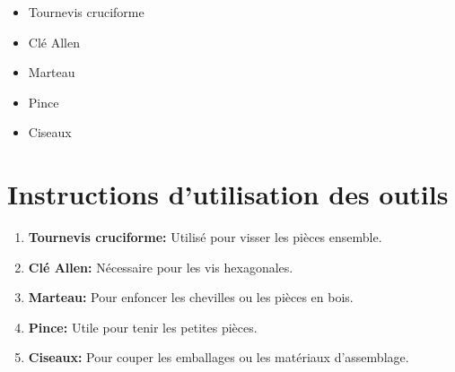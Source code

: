 
\begin{itemize}[label=\textbullet]
    \item Tournevis cruciforme
    \item Clé Allen
    \item Marteau
    \item Pince
    \item Ciseaux
\end{itemize}

\section*{Instructions d'utilisation des outils}

\begin{enumerate}
    \item \textbf{Tournevis cruciforme:} Utilisé pour visser les pièces ensemble.
    \item \textbf{Clé Allen:} Nécessaire pour les vis hexagonales.
    \item \textbf{Marteau:} Pour enfoncer les chevilles ou les pièces en bois.
    \item \textbf{Pince:} Utile pour tenir les petites pièces.
    \item \textbf{Ciseaux:} Pour couper les emballages ou les matériaux d'assemblage.
\end{enumerate}
